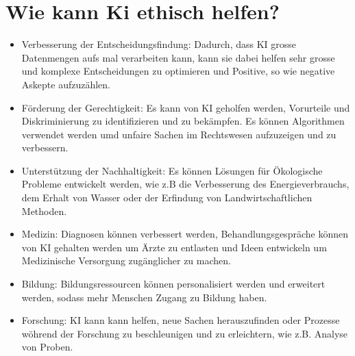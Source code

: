 \documentclass{report}
\begin{document}
\section{Wie kann Ki ethisch helfen?}
\begin{itemize}
    \item Verbesserung der Entscheidungsfindung: Dadurch, dass KI grosse Datenmengen aufs mal verarbeiten kann, kann sie dabei helfen sehr grosse und komplexe Entscheidungen zu optimieren und Positive, so wie negative Askepte aufzuzählen. 
    \item Förderung der Gerechtigkeit: Es kann von KI geholfen werden, Vorurteile und Diskriminierung zu identifizieren und zu bekämpfen. Es können Algorithmen verwendet werden umd unfaire Sachen im Rechtswesen aufzuzeigen und zu verbessern.
    \item Unterstützung der Nachhaltigkeit: Es können Lösungen für Ökologische Probleme entwickelt werden, wie z.B die Verbesserung des Energieverbrauchs, dem Erhalt von Wasser oder der Erfindung von Landwirtschaftlichen Methoden.
    \item Medizin: Diagnosen können verbessert werden, Behandlungsgespräche können von KI gehalten werden um Ärzte zu entlasten und Ideen entwickeln um Medizinische Versorgung zugänglicher zu machen.
    \item Bildung: Bildungsressourcen können personalisiert werden und erweitert werden, sodass mehr Menschen Zugang zu Bildung haben.
    \item Forschung: KI kann kann helfen, neue Sachen herauszufinden oder Prozesse wöhrend der Forschung zu beschleunigen und zu erleichtern, wie z.B. Analyse von Proben.
\end{itemize}
\end{document}
